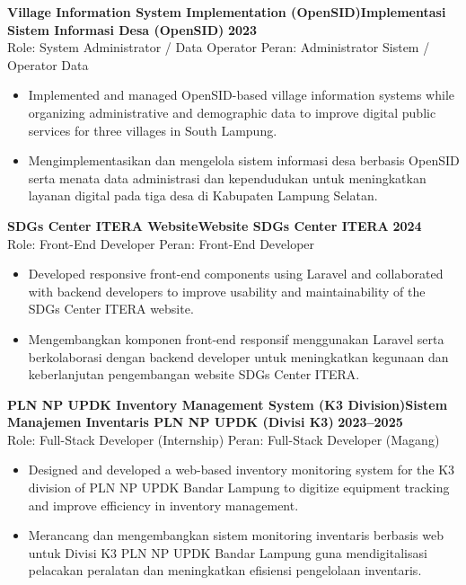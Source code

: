 

\textbf{\ifenglish Village Information System Implementation (OpenSID)\else Implementasi Sistem Informasi Desa (OpenSID)\fi} \hfill \textbf{2023} \\
\ifenglish Role: System Administrator / Data Operator
\else Peran: Administrator Sistem / Operator Data
\fi
\begin{itemize}[leftmargin=*, itemsep=1pt, topsep=1pt]
\ifenglish
\item Implemented and managed OpenSID-based village information systems while organizing administrative and demographic data to improve digital public services for three villages in South Lampung.
\else
\item Mengimplementasikan dan mengelola sistem informasi desa berbasis OpenSID serta menata data administrasi dan kependudukan untuk meningkatkan layanan digital pada tiga desa di Kabupaten Lampung Selatan.
\fi
\end{itemize}

\textbf{\ifenglish SDGs Center ITERA Website\else Website SDGs Center ITERA\fi} \hfill \textbf{2024} \\
\ifenglish Role: Front-End Developer
\else Peran: Front-End Developer
\fi
\begin{itemize}[leftmargin=*, itemsep=1pt, topsep=1pt]
\ifenglish
\item Developed responsive front-end components using Laravel and collaborated with backend developers to improve usability and maintainability of the SDGs Center ITERA website.
\else
\item Mengembangkan komponen front-end responsif menggunakan Laravel serta berkolaborasi dengan backend developer untuk meningkatkan kegunaan dan keberlanjutan pengembangan website SDGs Center ITERA.
\fi
\end{itemize}

\textbf{\ifenglish PLN NP UPDK Inventory Management System (K3 Division)\else Sistem Manajemen Inventaris PLN NP UPDK (Divisi K3)\fi} \hfill \textbf{2023--2025} \\
\ifenglish Role: Full-Stack Developer (Internship)
\else Peran: Full-Stack Developer (Magang)
\fi
\begin{itemize}[leftmargin=*, itemsep=1pt, topsep=1pt]
\ifenglish
\item Designed and developed a web-based inventory monitoring system for the K3 division of PLN NP UPDK Bandar Lampung to digitize equipment tracking and improve efficiency in inventory management.
\else
\item Merancang dan mengembangkan sistem monitoring inventaris berbasis web untuk Divisi K3 PLN NP UPDK Bandar Lampung guna mendigitalisasi pelacakan peralatan dan meningkatkan efisiensi pengelolaan inventaris.
\fi
\end{itemize}


